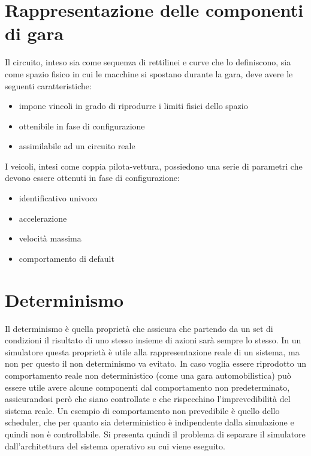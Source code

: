 
\section{Rappresentazione delle componenti di gara}
Il circuito, inteso sia come sequenza di rettilinei e curve che lo definiscono, sia come spazio fisico in cui le macchine si spostano durante la gara, deve avere le seguenti caratteristiche:
\begin{itemize}
\item impone vincoli in grado di riprodurre i limiti fisici dello spazio
\item ottenibile in fase di configurazione
\item assimilabile ad un circuito reale
\end{itemize}

I veicoli, intesi come coppia pilota-vettura, possiedono una serie di parametri che devono essere ottenuti in fase di configurazione:
\begin{itemize}
\item identificativo univoco
\item accelerazione
\item velocità massima
\item comportamento di default
\end{itemize}


\section{Determinismo}
Il determinismo è quella proprietà che assicura che partendo da un set di condizioni il risultato di uno stesso insieme di azioni sarà sempre lo stesso. In un simulatore questa proprietà è utile alla rappresentazione reale di un sistema, ma non per questo il non determinismo va evitato. In caso voglia essere riprodotto un comportamento reale non deterministico (come una gara automobilistica) può essere utile avere alcune componenti dal comportamento non predeterminato, assicurandosi però che siano controllate e che rispecchino l'imprevedibilità del sistema reale. Un esempio di comportamento non prevedibile è quello dello scheduler, che per quanto sia deterministico è indipendente dalla simulazione e quindi non è controllabile. Si presenta quindi il problema di separare il simulatore dall'architettura del sistema operativo su cui viene eseguito.

